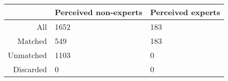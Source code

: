 \begin{table}[ht]
\centering
\begin{tabular}{rll}
  \hline
 & Perceived non-experts & Perceived experts \\ 
  \hline
All & 1652 & 183 \\ 
  Matched & 549 & 183 \\ 
  Unmatched & 1103 & 0 \\ 
  Discarded & 0 & 0 \\ 
   \hline
\end{tabular}
\end{table}
